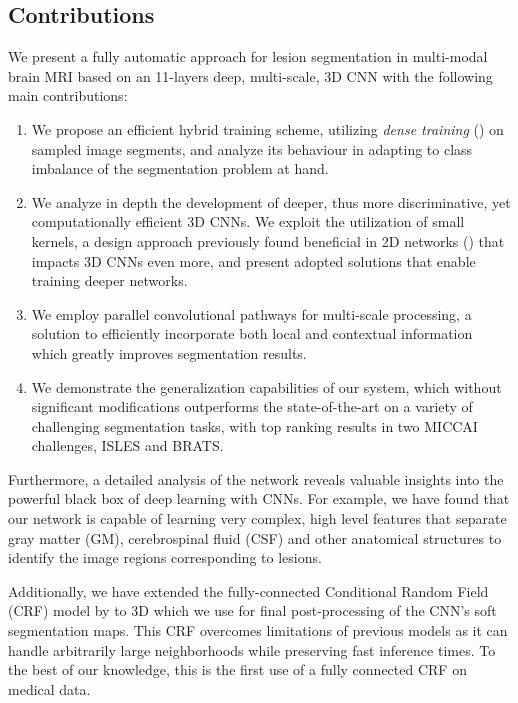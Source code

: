 \documentclass[preprint,authoryear,12pt]{elsarticle}
\begin{document}
\subsection{Contributions}

We present a fully automatic approach for lesion segmentation in multi-modal brain MRI based on an 11-layers deep, multi-scale, 3D CNN with the following main contributions:

\begin{enumerate}

\item We propose an efficient hybrid training scheme, utilizing \textit{dense training} (\cite{Long2014}) on sampled image segments, and analyze its behaviour in adapting to class imbalance of the segmentation problem at hand.

\item We analyze in depth the development of deeper, thus more discriminative, yet computationally efficient 3D CNNs. We exploit the utilization of small kernels, a design approach previously found beneficial in 2D networks (\cite{Simonyan2014}) that impacts 3D CNNs even more, and present adopted solutions that enable training deeper networks. 

\item We employ parallel convolutional pathways for multi-scale processing, a solution to efficiently incorporate both local and contextual information which greatly improves segmentation results.

\item We demonstrate the generalization capabilities of our system, which without significant modifications outperforms the state-of-the-art on a variety of challenging segmentation tasks, with top ranking results in two MICCAI challenges, ISLES and BRATS.

\end{enumerate}

Furthermore, a detailed analysis of the network reveals valuable insights into the powerful black box of deep learning with CNNs. For example, we have found that our network is capable of learning very complex, high level features that separate gray matter (GM), cerebrospinal fluid (CSF) and other anatomical structures to identify the image regions corresponding to lesions.

Additionally, we have extended the fully-connected Conditional Random Field (CRF) model by \cite{Krahenbuhl2013} to 3D which we use for final post-processing of the CNN's soft segmentation maps. This CRF overcomes limitations of previous models as it can handle arbitrarily large neighborhoods while preserving fast inference times. To the best of our knowledge, this is the first use of a fully connected CRF on medical data.
\end{document}
